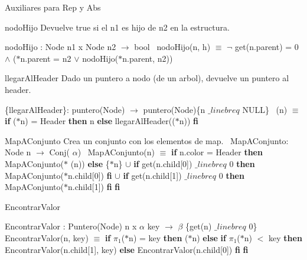 \begin{DoxyVerb}Auxiliares para Rep y Abs
\end{DoxyVerb}


\begin{DoxyParagraph}{nodo\+Hijo}
Devuelve true si el n1 es hijo de n2 en la estructura.

nodo\+Hijo \+: Node n1 x Node n2 $\to$ bool~\newline
nodo\+Hijo(n, h) $\equiv$ $\lnot$ get(n.\+parent) = 0 $\land$ ($\ast$n.parent = n2 $\lor$ nodo\+Hijo($\ast$n.parent, n2)) 
\end{DoxyParagraph}


\begin{DoxyParagraph}{llegar\+Al\+Header}
Dado un puntero a nodo (de un arbol), devuelve un puntero al header.

\{llegar\+Al\+Header\}\+: puntero(\+Node) $\to$ puntero(\+Node)\{n $\_linebr eq$ N\+U\+LL\}~\newline
(n) $\equiv$ {\bfseries if} ($\ast$n) = Header {\bfseries then} n {\bfseries else} llegar\+Al\+Header(($\ast$n)) {\bfseries fi} 


\end{DoxyParagraph}
\begin{DoxyParagraph}{Map\+A\+Conjunto}
Crea un conjunto con los elementos de map.~\newline
 Map\+A\+Conjunto\+: Node n $\to$ Conj( $\alpha$)~\newline
Map\+A\+Conjunto(n) $\equiv$ {\bfseries if} n.\+color = Header {\bfseries then} Map\+A\+Conjunto($\ast$ (n)) {\bfseries else} \{$\ast$n\} $\cup$ {\bfseries if} get(n.\+child\mbox{[}0\mbox{]}) $\_linebr eq$ 0 {\bfseries then} Map\+A\+Conjunto($\ast$n.child\mbox{[}0\mbox{]}) {\bfseries fi} $\cup$ {\bfseries if} get(n.\+child\mbox{[}1\mbox{]}) $\_linebr eq$ 0 {\bfseries then} Map\+A\+Conjunto($\ast$n.child\mbox{[}1\mbox{]}) {\bfseries fi} {\bfseries fi} 
\end{DoxyParagraph}


\begin{DoxyParagraph}{Encontrar\+Valor}


Encontrar\+Valor \+: Puntero(\+Node) n x $\alpha$ key $\to$ $\beta$ \{get(n) $\_linebr eq$ 0\}~\newline
Encontrar\+Valor(n, key) $\equiv$ {\bfseries if} $\pi_1$($\ast$n) = key {\bfseries then} ($\ast$n) {\bfseries else} {\bfseries if} $\pi_1$($\ast$n) $<$ key {\bfseries then} Encontrar\+Valor(n.\+child\mbox{[}1\mbox{]}, key) {\bfseries else} Encontrar\+Valor(n.\+child\mbox{[}0\mbox{]}) {\bfseries fi} {\bfseries fi} 
\end{DoxyParagraph}


